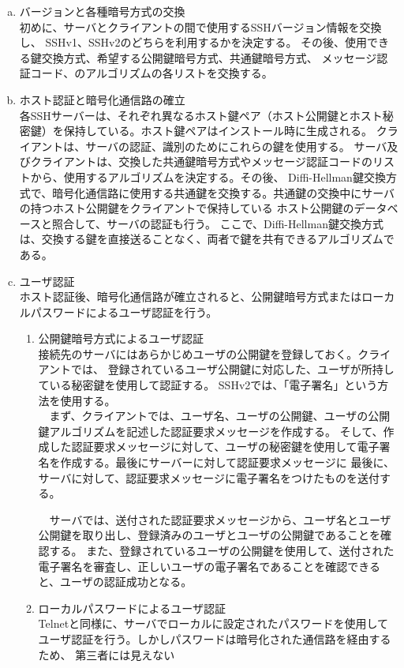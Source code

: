 \documentclass[11pt,a4j,titlepage]{jreport}
\begin{document}
\begin{enumerate}[(a)]
    \setlength{\parskip}{0.05cm} %
    \setlength{\itemsep}{0.05cm}
    \item バージョンと各種暗号方式の交換\mbox{}\\ 
    初めに、サーバとクライアントの間で使用するSSHバージョン情報を交換し、
    SSHv1、SSHv2のどちらを利用するかを決定する。
    その後、使用できる鍵交換方式、希望する公開鍵暗号方式、共通鍵暗号方式、
    メッセージ認証コード、のアルゴリズムの各リストを交換する。
    \item ホスト認証と暗号化通信路の確立\mbox{}\\
    各SSHサーバーは、それぞれ異なるホスト鍵ペア（ホスト公開鍵とホスト秘密鍵）を保持している。ホスト鍵ペアはインストール時に生成される。
    クライアントは、サーバの認証、識別のためにこれらの鍵を使用する。
    サーバ及びクライアントは、交換した共通鍵暗号方式やメッセージ認証コードのリストから、使用するアルゴリズムを決定する。その後、
    Diffi-Hellman鍵交換方式で、暗号化通信路に使用する共通鍵を交換する。共通鍵の交換中にサーバの持つホスト公開鍵をクライアントで保持している
    ホスト公開鍵のデータベースと照合して、サーバの認証も行う。
    ここで、Diffi-Hellman鍵交換方式は、交換する鍵を直接送ることなく、両者で鍵を共有できるアルゴリズムである。
    \item ユーザ認証\mbox{}\\ホスト認証後、暗号化通信路が確立されると、公開鍵暗号方式またはローカルパスワードによるユーザ認証を行う。
    \begin{enumerate}[(1)]
        \setlength{\parskip}{0.05cm} %
        \setlength{\itemsep}{0.05cm}
        \item 公開鍵暗号方式によるユーザ認証\mbox{}\\ 接続先のサーバにはあらかじめユーザの公開鍵を登録しておく。クライアントでは、
        登録されているユーザ公開鍵に対応した、ユーザが所持している秘密鍵を使用して認証する。
        SSHv2では、「電子署名」という方法を使用する。\\
        \ \ まず、クライアントでは、ユーザ名、ユーザの公開鍵、ユーザの公開鍵アルゴリズムを記述した認証要求メッセージを作成する。
        そして、作成した認証要求メッセージに対して、ユーザの秘密鍵を使用して電子署名を作成する。最後にサーバーに対して認証要求メッセージに
        最後に、サーバに対して、認証要求メッセージに電子署名をつけたものを送付する。
        
        \ \ サーバでは、送付された認証要求メッセージから、ユーザ名とユーザ公開鍵を取り出し、登録済みのユーザとユーザの公開鍵であることを確認する。
        また、登録されているユーザの公開鍵を使用して、送付された電子署名を審査し、正しいユーザの電子署名であることを確認できると、ユーザの認証成功となる。
        \item ローカルパスワードによるユーザ認証\mbox{}\\
        Telnetと同様に、サーバでローカルに設定されたパスワードを使用してユーザ認証を行う。しかしパスワードは暗号化された通信路を経由するため、
        第三者には見えない
        

\end{enumerate}
\end{enumerate}
\end{document}
